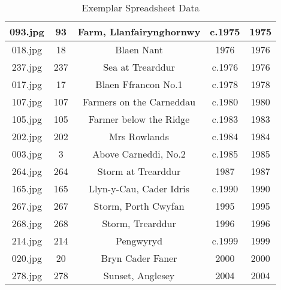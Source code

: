 \begin{table}[h]
{\begin{tabular}{|c|c|c|c|c|}
093.jpg & 93 & Farm, Llanfairynghornwy & c.1975 & 1975\\\hline
018.jpg & 18 & Blaen Nant & 1976 & 1976\\\hline
237.jpg & 237 & Sea at Trearddur & c.1976 & 1976\\\hline
017.jpg & 17 & Blaen Ffrancon No.1 & c.1978 & 1978\\\hline
107.jpg & 107 & Farmers on the Carneddau & c.1980 & 1980\\\hline
105.jpg & 105 & Farmer below the Ridge & c.1983 & 1983\\\hline
202.jpg & 202 & Mrs Rowlands & c.1984 & 1984\\\hline
003.jpg & 3 & Above Carneddi, No.2 & c.1985 & 1985\\\hline
264.jpg & 264 & Storm at Trearddur & 1987 & 1987\\\hline
165.jpg & 165 & Llyn-y-Cau, Cader Idris & c.1990 & 1990\\\hline
267.jpg & 267 & Storm, Porth Cwyfan & 1995 & 1995\\\hline
268.jpg & 268 & Storm, Trearddur & 1996 & 1996\\\hline
214.jpg & 214 & Pengwyryd & c.1999 & 1999\\\hline
020.jpg & 20 & Bryn Cader Faner & 2000 & 2000\\\hline
278.jpg & 278 & Sunset, Anglesey & 2004 & 2004\\\hline
\end{tabular}
}
\caption{Exemplar Spreadsheet Data}\label{tab:exemplar-spreadsheet}
\end{table}
